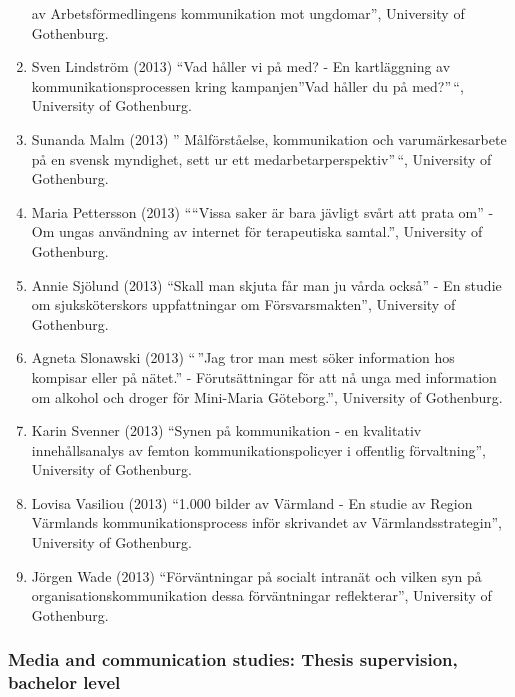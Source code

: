 \documentclass[
]{article}
\begin{document}
\begin{enumerate}
  av Arbetsförmedlingens kommunikation mot ungdomar'', University of
  Gothenburg.
\item
  Sven Lindström (2013) ``Vad håller vi på med? - En kartläggning av
  kommunikationsprocessen kring kampanjen''Vad håller du på med?''\,``,
  University of Gothenburg.
\item
  Sunanda Malm (2013) '' Målförståelse, kommunikation och
  varumärkesarbete på en svensk myndighet, sett ur ett
  medarbetarperspektiv''\,``, University of Gothenburg.
\item
  Maria Pettersson (2013) ````Vissa saker är bara jävligt svårt att
  prata om'' - Om ungas användning av internet för terapeutiska
  samtal.'', University of Gothenburg.
\item
  Annie Sjölund (2013) ``Skall man skjuta får man ju vårda också'' - En
  studie om sjuksköterskors uppfattningar om Försvarsmakten'',
  University of Gothenburg.
\item
  Agneta Slonawski (2013) ``\,''Jag tror man mest söker information hos
  kompisar eller på nätet.'' - Förutsättningar för att nå unga med
  information om alkohol och droger för Mini-Maria Göteborg.'',
  University of Gothenburg.
\item
  Karin Svenner (2013) ``Synen på kommunikation - en kvalitativ
  innehållsanalys av femton kommunikationspolicyer i offentlig
  förvaltning'', University of Gothenburg.
\item
  Lovisa Vasiliou (2013) ``1.000 bilder av Värmland - En studie av
  Region Värmlands kommunikationsprocess inför skrivandet av
  Värmlandsstrategin'', University of Gothenburg.
\item
  Jörgen Wade (2013) ``Förväntningar på socialt intranät och vilken syn
  på organisationskommunikation dessa förväntningar reflekterar'',
  University of Gothenburg.
\end{enumerate}

\hypertarget{media-and-communication-studies-thesis-supervision-bachelor-level}{%
\subsubsection{Media and communication studies: Thesis supervision,
bachelor
level}\label{media-and-communication-studies-thesis-supervision-bachelor-level}}
\end{document}
